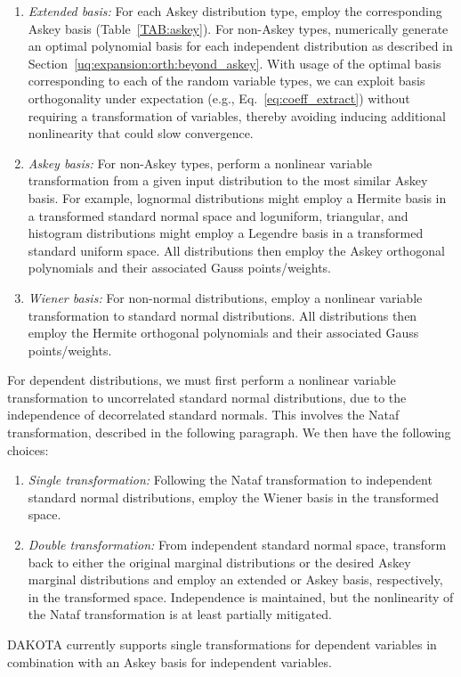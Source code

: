 \begin{enumerate}
\item {\it Extended basis:} For each Askey distribution type, employ
  the corresponding Askey basis (Table~\ref{TAB:askey}).  For
  non-Askey types, numerically generate an optimal polynomial basis
  for each independent distribution as described in
  Section~\ref{uq:expansion:orth:beyond_askey}.
  With usage of the optimal basis corresponding to each of the random
  variable types, we can exploit basis orthogonality under expectation
  (e.g., Eq.~\ref{eq:coeff_extract}) without requiring a transformation
  of variables, thereby avoiding inducing additional nonlinearity that
  could slow convergence.
\item {\it Askey basis:} For non-Askey types, perform a nonlinear
  variable transformation from a given input distribution to the most
  similar Askey basis.  For example, lognormal distributions might
  employ a Hermite basis in a transformed standard normal space and
  loguniform, triangular, and histogram distributions might employ a
  Legendre basis in a transformed standard uniform space.  All
  distributions then employ the Askey orthogonal polynomials and
  their associated Gauss points/weights.
\item {\it Wiener basis:} For non-normal distributions, employ a
  nonlinear variable transformation to standard normal distributions. All
  distributions then employ the Hermite orthogonal polynomials and
  their associated Gauss points/weights.
\end{enumerate}
For dependent distributions, we must first perform a nonlinear
variable transformation to uncorrelated standard normal distributions,
due to the independence of decorrelated standard normals.  This
involves the Nataf transformation, described in the following
paragraph.  We then have the following choices:
\begin{enumerate}
\item {\it Single transformation:} Following the Nataf transformation
  to independent standard normal distributions, employ the Wiener
  basis in the transformed space.
\item {\it Double transformation:} From independent standard normal
  space, transform back to either the original marginal distributions
  or the desired Askey marginal distributions and employ an extended
  or Askey basis, respectively, in the transformed space. Independence
  is maintained, but the nonlinearity of the Nataf transformation is
  at least partially mitigated.
\end{enumerate}
DAKOTA currently supports single transformations for dependent
variables in combination with an Askey basis for independent variables.


